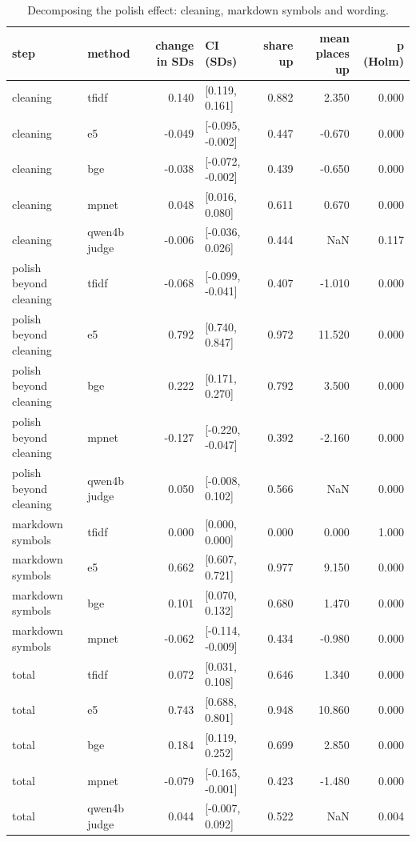 \begin{table}
\caption{Decomposing the polish effect: cleaning, markdown symbols and wording.}
\label{tab:t8b_steps}
\begin{tabular}{llrlrrr}
\toprule
step & method & change in SDs & CI (SDs) & share up & mean places up & p (Holm) \\
\midrule
cleaning & tfidf & 0.140 & [0.119, 0.161] & 0.882 & 2.350 & 0.000 \\
cleaning & e5 & -0.049 & [-0.095, -0.002] & 0.447 & -0.670 & 0.000 \\
cleaning & bge & -0.038 & [-0.072, -0.002] & 0.439 & -0.650 & 0.000 \\
cleaning & mpnet & 0.048 & [0.016, 0.080] & 0.611 & 0.670 & 0.000 \\
cleaning & qwen4b judge & -0.006 & [-0.036, 0.026] & 0.444 & NaN & 0.117 \\
polish beyond cleaning & tfidf & -0.068 & [-0.099, -0.041] & 0.407 & -1.010 & 0.000 \\
polish beyond cleaning & e5 & 0.792 & [0.740, 0.847] & 0.972 & 11.520 & 0.000 \\
polish beyond cleaning & bge & 0.222 & [0.171, 0.270] & 0.792 & 3.500 & 0.000 \\
polish beyond cleaning & mpnet & -0.127 & [-0.220, -0.047] & 0.392 & -2.160 & 0.000 \\
polish beyond cleaning & qwen4b judge & 0.050 & [-0.008, 0.102] & 0.566 & NaN & 0.000 \\
markdown symbols & tfidf & 0.000 & [0.000, 0.000] & 0.000 & 0.000 & 1.000 \\
markdown symbols & e5 & 0.662 & [0.607, 0.721] & 0.977 & 9.150 & 0.000 \\
markdown symbols & bge & 0.101 & [0.070, 0.132] & 0.680 & 1.470 & 0.000 \\
markdown symbols & mpnet & -0.062 & [-0.114, -0.009] & 0.434 & -0.980 & 0.000 \\
total & tfidf & 0.072 & [0.031, 0.108] & 0.646 & 1.340 & 0.000 \\
total & e5 & 0.743 & [0.688, 0.801] & 0.948 & 10.860 & 0.000 \\
total & bge & 0.184 & [0.119, 0.252] & 0.699 & 2.850 & 0.000 \\
total & mpnet & -0.079 & [-0.165, -0.001] & 0.423 & -1.480 & 0.000 \\
total & qwen4b judge & 0.044 & [-0.007, 0.092] & 0.522 & NaN & 0.004 \\
\bottomrule
\end{tabular}
\end{table}
